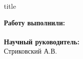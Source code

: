 


 
\begin{frame}[plain]
	\begin{center}
		\small{\insertinstitute}
		\vspace{1cm}
		
		\begin{beamercolorbox}[sep=8pt,center]{title}
			\inserttitle
		\end{beamercolorbox}
		\vspace{0.5cm}
	\end{center}

	\begin{flushright}
		\normalsize \textbf{Работу выполнили:}\\
		\large
		\insertauthor \\
		\vspace{0.5cm}
		\normalsize{\textbf{Научный руководитель:}\\}
		\large{Стриковский А.В.}
		\vfill
	\end{flushright}
\end{frame}